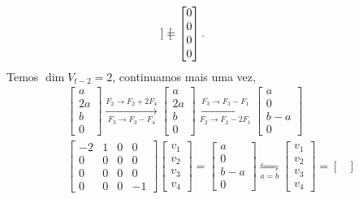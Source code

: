 {{\begin{align*}
\begin{bmatrix}
\end{bmatrix} = \begin{bmatrix}
    0 \\ 0 \\ 0 \\ 0
\end{bmatrix}.\hspace{1.5cm} 
\end{align*}} 
Temos \(\dim V_{t-2} = 2\), continuamos mais uma vez, 
{\small \begin{align*}\begin{bmatrix}
    a \\ 2a \\ b \\ 0
\end{bmatrix} \overset{F_2 \to F_2 + 2F_4}{\underset{F_3 \to F_3-F_4}{\longrightarrow}} \begin{bmatrix}
    a \\ 2a \\ b \\ 0
\end{bmatrix}\overset{F_3 \to F_3 - F_1}{\underset{F_2 \to F_2 - 2F_1}{\longrightarrow}} \begin{bmatrix}
    a \\ 0 \\ b-a \\ 0
\end{bmatrix} \hspace{1cm}\\ 
\begin{bmatrix}
-2 & 1 & 0 & 0 \\ 
0 & 0 & 0 & 0 \\ 
0 & 0 & 0 & 0 \\ 
0 & 0 & 0 & -1
\end{bmatrix}\begin{bmatrix}
    v_1 \\ v_2 \\ v_3 \\ v_4
\end{bmatrix} = \begin{bmatrix}
    a \\ 0 \\ b-a \\ 0
\end{bmatrix} \underset{a=b}{\leftrightharpoons} \begin{bmatrix}
    v_1 \\ v_2 \\ v_3 \\ v_4
\end{bmatrix} = \begin{bmatrix}

\end{bmatrix}
\end{align*}}}
